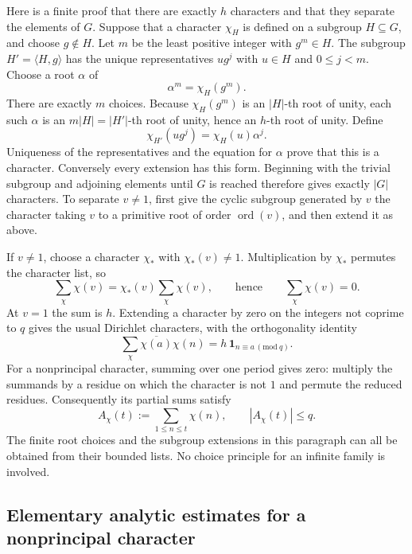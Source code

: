 Here is a finite proof that there are exactly $h$ characters and that they
separate the elements of $G$.  Suppose that a character $\chi_H$ is defined
on a subgroup $H\subseteq G$, and choose $g\notin H$.  Let $m$ be the least
positive integer with $g^m\in H$.  The subgroup $H'=\langle H,g\rangle$
has the unique representatives $ug^j$ with $u\in H$ and $0\leq j<m$.
Choose a root $\alpha$ of
\[
 \alpha^m=\chi_H(g^m).
\]
There are exactly $m$ choices.  Because $\chi_H(g^m)$ is an $|H|$-th root
of unity, each such $\alpha$ is an $m|H|=|H'|$-th root of unity, hence an
$h$-th root of unity.  Define
\[
 \chi_{H'}(ug^j)=\chi_H(u)\alpha^j.
\]
Uniqueness of the representatives and the equation for $\alpha$ prove that
this is a character.  Conversely every extension has this form.  Beginning
with the trivial subgroup and adjoining elements until $G$ is reached
therefore gives exactly $|G|$ characters.  To separate $v\neq1$, first
give the cyclic subgroup generated by $v$ the character taking $v$ to a
primitive root of order $\operatorname{ord}(v)$, and then extend it as above.

If $v\neq1$, choose a character $\chi_*$ with $\chi_*(v)\neq1$.
Multiplication by $\chi_*$ permutes the character list, so
\[
 \sum_\chi\chi(v)=\chi_*(v)\sum_\chi\chi(v),
 \qquad\text{hence}\qquad \sum_\chi\chi(v)=0.
\]
At $v=1$ the sum is $h$.  Extending a character by zero on the integers not
coprime to $q$ gives the usual Dirichlet characters, with the orthogonality
identity
\begin{equation}
 \sum_\chi\overline{\chi(a)}\chi(n)
   =h\,\mathbf 1_{n\equiv a\, (\mathrm{mod}\ q)}.
 \label{eq:finite-character-orthogonality}
\end{equation}
For a nonprincipal character, summing over one period gives zero: multiply
the summands by a residue on which the character is not $1$ and permute the
reduced residues.  Consequently its partial sums satisfy
\begin{equation}
 A_\chi(t):=\sum_{1\leq n\leq t}\chi(n),\qquad |A_\chi(t)|\leq q.
 \label{eq:partial-character-bound}
\end{equation}
The finite root choices and the subgroup extensions in this paragraph can
all be obtained from their bounded lists.  No choice principle for an
infinite family is involved.

\subsection{Elementary analytic estimates for a nonprincipal character}

